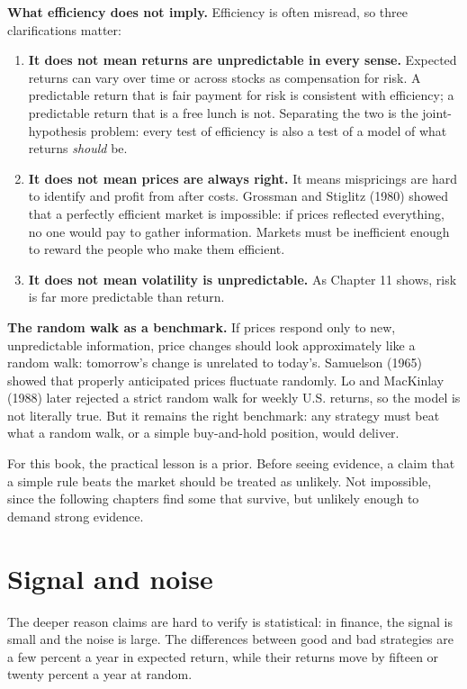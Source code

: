 \textbf{What efficiency does not imply.} Efficiency is often misread, so three clarifications matter:

\begin{enumerate}
  \item \textbf{It does not mean returns are unpredictable in every sense.} Expected returns can vary over time or across stocks as compensation for risk. A predictable return that is fair payment for risk is consistent with efficiency; a predictable return that is a free lunch is not. Separating the two is the joint-hypothesis problem: every test of efficiency is also a test of a model of what returns \emph{should} be.
  \item \textbf{It does not mean prices are always right.} It means mispricings are hard to identify and profit from after costs. Grossman and Stiglitz (1980) showed that a perfectly efficient market is impossible: if prices reflected everything, no one would pay to gather information. Markets must be inefficient enough to reward the people who make them efficient.
  \item \textbf{It does not mean volatility is unpredictable.} As Chapter 11 shows, risk is far more predictable than return.
\end{enumerate}

\textbf{The random walk as a benchmark.} If prices respond only to new, unpredictable information, price changes should look approximately like a random walk: tomorrow's change is unrelated to today's. Samuelson (1965) showed that properly anticipated prices fluctuate randomly. Lo and MacKinlay (1988) later rejected a strict random walk for weekly U.S. returns, so the model is not literally true. But it remains the right benchmark: any strategy must beat what a random walk, or a simple buy-and-hold position, would deliver.

For this book, the practical lesson is a prior. Before seeing evidence, a claim that a simple rule beats the market should be treated as unlikely. Not impossible, since the following chapters find some that survive, but unlikely enough to demand strong evidence.

\section{Signal and noise}
\label{sec:01-signal-noise}

The deeper reason claims are hard to verify is statistical: in finance, the signal is small and the noise is large. The differences between good and bad strategies are a few percent a year in expected return, while their returns move by fifteen or twenty percent a year at random.

